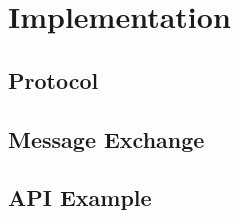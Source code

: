 







\section{Implementation}

\subsection{Protocol}

\subsection{Message Exchange}

\subsection{API Example}\label{api_example}

